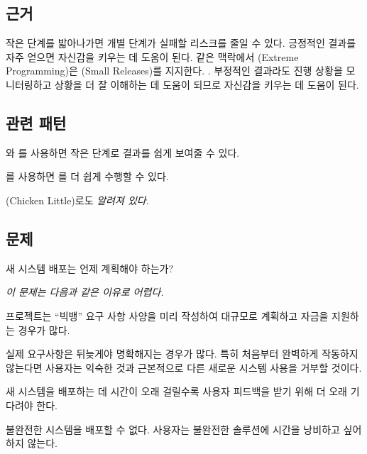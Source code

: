 \documentclass[a4paper,10pt,twoside]{book}
\begin{document}
\subsection*{근거}

작은 단계를 밟아나가면 개별 단계가 실패할 리스크를 줄일 수 있다. 긍정적인 결과를 자주 얻으면 자신감을 키우는 데 도움이 된다. 같은 맥락에서 (Extreme Programming)은 (Small Releases)를 지지한다. \cite{Beck00a}. 부정적인 결과라도 진행 상황을 모니터링하고 상황을 더 잘 이해하는 데 도움이 되므로 자신감을 키우는 데 도움이 된다.

\subsection*{관련 패턴}

와 를 사용하면 작은 단계로 결과를 쉽게 보여줄 수 있다. 

를 사용하면 를 더 쉽게 수행할 수 있다. 


(Chicken Little)로도 \emph{알려져 있다}. \cite{Brod95a}


\subsection*{문제}

새 시스템 배포는 언제 계획해야 하는가?

\emph{이 문제는 다음과 같은 이유로 어렵다.}

\begin{bulletlist}
\item 프로젝트는 ``빅뱅'' 요구 사항 사양을 미리 작성하여 대규모로 계획하고 자금을 지원하는 경우가 많다.

\item 실제 요구사항은 뒤늦게야 명확해지는 경우가 많다. 특히 처음부터 완벽하게 작동하지 않는다면 사용자는 익숙한 것과 근본적으로 다른 새로운 시스템 사용을 거부할 것이다.

\item 새 시스템을 배포하는 데 시간이 오래 걸릴수록 사용자 피드백을 받기 위해 더 오래 기다려야 한다.

\item 불완전한 시스템을 배포할 수 없다. 사용자는 불완전한 솔루션에 시간을 낭비하고 싶어하지 않는다.
\end{bulletlist}
\end{document}
